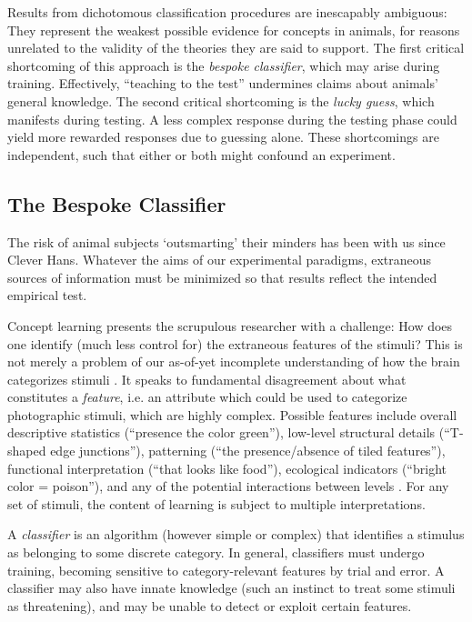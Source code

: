\documentclass{frontiersSCNS} %
\begin{document}
Results from dichotomous classification procedures are inescapably ambiguous: They represent the weakest possible evidence for concepts in animals, for reasons unrelated to the validity of the theories they are said to support. The first critical shortcoming of this approach is the \textsl{bespoke classifier}, which may arise during training. Effectively, ``teaching to the test'' undermines claims about animals' general knowledge. The second critical shortcoming is the \textsl{lucky guess}, which manifests during testing. A less complex response during the testing phase could yield more rewarded responses due to guessing alone. These shortcomings are independent, such that either or both might confound an experiment.

\subsection{The Bespoke Classifier}

The risk of animal subjects `outsmarting' their minders has been with us since Clever Hans. Whatever the aims of our experimental paradigms, extraneous sources of information must be minimized so that results reflect the intended empirical test.

Concept learning presents the scrupulous researcher with a challenge: How does one identify (much less control for) the extraneous features of the stimuli? This is not merely a problem of our as-of-yet incomplete understanding of how the brain categorizes stimuli \citep{Free2011}. It speaks to fundamental disagreement about what constitutes a \textsl{feature}, i.e. an attribute which could be used to categorize photographic stimuli, which are highly complex. Possible features include overall descriptive statistics (``presence the color green''), low-level structural details (``T-shaped edge junctions''), patterning (``the presence/absence of tiled features''), functional interpretation (``that looks like food''), ecological indicators (``bright color = poison''), and any of the potential interactions between levels \citep[cf.][]{Spal2000, Mars2008}. For any set of stimuli, the content of learning is subject to multiple interpretations.

A \textsl{classifier} is an algorithm (however simple or complex) that identifies a stimulus as belonging to some discrete category. In general, classifiers must undergo training, becoming sensitive to category-relevant features by trial and error. A classifier may also have innate knowledge (such an instinct to treat some stimuli as threatening), and may be unable to detect or exploit certain features.
\end{document}
